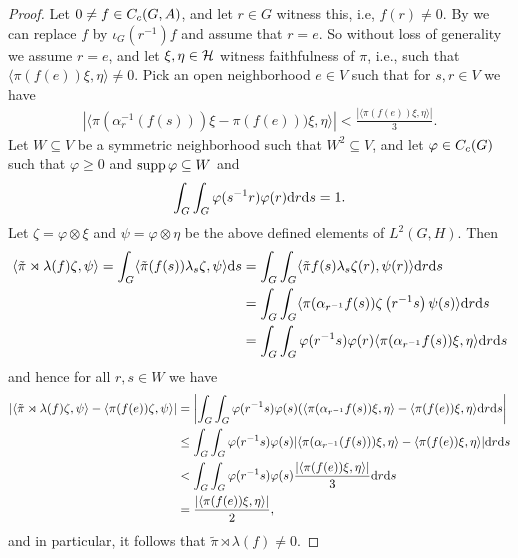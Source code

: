\begin{proof}
	Let $0 \neq f \in C_c(G,A)$, and let $r \in G$ witness this, i.e, $f(r) \neq 0$. By  we can replace $f$ by $\iota_G(r^{-1})f$ and assume that $r=e$. So without loss of generality we assume $r = e$, and let $\xi, \eta \in \mathcal{H}$ witness faithfulness of $\pi$, i.e., such that $\langle \pi ( f(e)) \xi, \eta \rangle \neq 0$. Pick an open neighborhood $e \in V$ such that for $s,r \in V$ we have 
	\begin{align*}
		| \langle \pi(\alpha_r^{-1}(f(s))) \xi  - \pi(f(e)))\xi , \eta \rangle|  < \frac{| \langle \pi (f(e)) \xi , \eta\rangle|}{3}.
	\end{align*}
Let $W \subseteq V$ be a symmetric neighborhood such that $W^2 \subseteq V$, and let $\varphi \in C_c(G)$ such that $\varphi \geq 0$ and $\operatorname{supp} \varphi \subseteq W$ and
\begin{align*}
	\int_G \int_G \varphi(s^{-1}r) \varphi(r) \mathrm{d} r \mathrm{d} s = 1.
\end{align*}
Let $\zeta = \varphi \otimes \xi$ and $\psi = \varphi \otimes \eta$ be the above defined elements of $L^2(G,H)$. Then
\begin{align*}
	\langle \tilde{ \pi } \rtimes \lambda (f) \zeta, \psi \rangle  =  \int_G \langle \tilde{\pi}(f(s)) \lambda_s \zeta , \psi\rangle \mathrm{d} s &= \int_G \int_G \langle \tilde{\pi} f(s) \lambda_s \zeta(r) , \psi(r) \rangle \mathrm{d} r \mathrm{d} s\\
	&= \int_G \int_G \langle \pi(\alpha_{r^{-1}}f(s)) \zeta\left( r^{-1}s \right) \psi(s) \rangle \mathrm{d} r \mathrm{d} s\\
	&= \int_G \int_G \varphi(r^{-1}s) \varphi(r) \langle \pi(\alpha_{r^{-1}}f(s)) \xi , \eta \rangle \mathrm{d} r \mathrm{d} s
\end{align*}
and hence for all $r,s \in W$ we have
\begin{align*}
	\left | \langle\tilde{\pi} \rtimes \lambda (f) \zeta , \psi \rangle - \langle \pi(f(e)) \zeta , \psi \rangle\right | &=  \left |  \int_G \int_G\varphi(r^{-1}s) \varphi (s) (\langle \pi(\alpha_{r^{-1}} f(s)) \xi , \eta \rangle - \langle \pi(f(e)) \xi , \eta \rangle  \mathrm{d} r \mathrm{d} s \right | \\
	&\leq \int_G \int_G \varphi(r^{-1}s ) \varphi (s) | \langle \pi(\alpha_{r^{-1}}(f(s))) \xi , \eta\rangle - \langle \pi(f(e)) \xi , \eta \rangle | \mathrm{d} r \mathrm{d} s \\
	&< \int_G \int_G \varphi(r^{-1}s) \varphi(s) \frac{| \langle \pi(f(e)) \xi, \eta \rangle|}{3} \mathrm{d} r \mathrm{d} s \\
	&= \frac{| \langle \pi(f(e)) \xi , \eta \rangle|} {2},
\end{align*}
and in particular, it follows that $\tilde{\pi} \rtimes \lambda (f) \neq 0$.
\end{proof}

